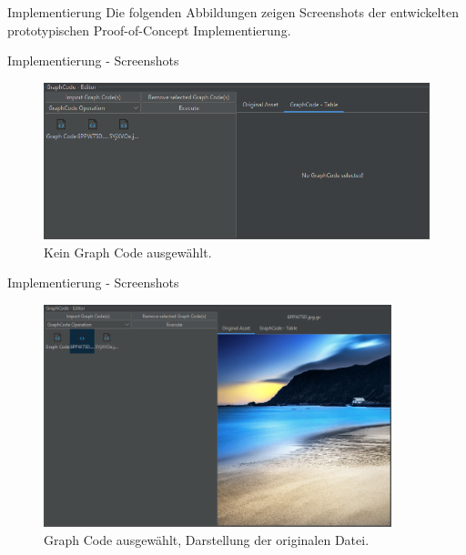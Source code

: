 \documentclass[t]{beamer}
\begin{document}
\begin{frame}{Implementierung}
  Die folgenden Abbildungen zeigen Screenshots der entwickelten prototypischen Proof-of-Concept Implementierung.
\end{frame}

\begin{frame}{Implementierung - Screenshots}

  \begin{figure}
    \includegraphics[width=\textwidth]{images/left_no_sel}
    \caption{Kein Graph Code ausgewählt.}
  \end{figure}

\end{frame}

\begin{frame}{Implementierung - Screenshots}

  \begin{figure}
    \includegraphics[width=0.9\textwidth]{images/left_sel_original}
    \caption{Graph Code ausgewählt, Darstellung der originalen Datei.}
  \end{figure}

\end{frame}
\end{document}
